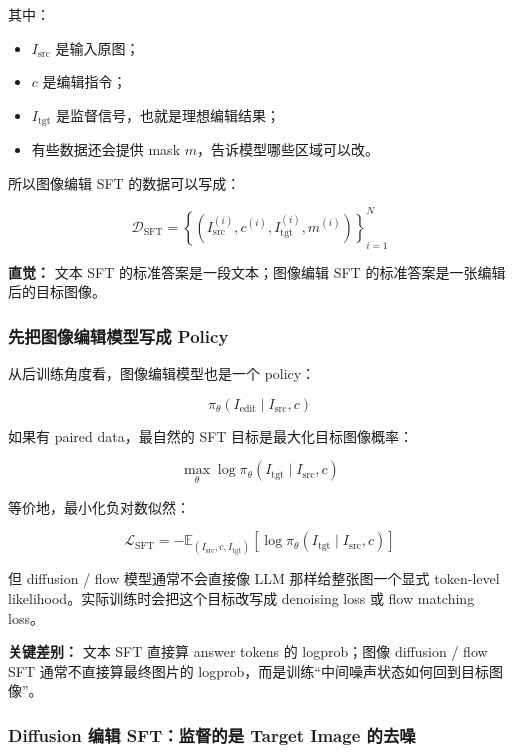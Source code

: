 其中：

\begin{itemize}[leftmargin=1.5em]
  \item $I_\text{src}$ 是输入原图；
  \item $c$ 是编辑指令；
  \item $I_\text{tgt}$ 是监督信号，也就是理想编辑结果；
  \item 有些数据还会提供 mask $m$，告诉模型哪些区域可以改。
\end{itemize}

所以图像编辑 SFT 的数据可以写成：

\[
\mathcal{D}_\text{SFT}
=
\left\{
\left(
I_\text{src}^{(i)},
c^{(i)},
I_\text{tgt}^{(i)},
m^{(i)}
\right)
\right\}_{i=1}^{N}
\]

\begin{intubox}
\textbf{直觉：} 文本 SFT 的标准答案是一段文本；图像编辑 SFT 的标准答案是一张编辑后的目标图像。
\end{intubox}

\subsubsection{先把图像编辑模型写成 Policy}

从后训练角度看，图像编辑模型也是一个 policy：

\[
\pi_\theta(I_\text{edit}\mid I_\text{src},c)
\]

如果有 paired data，最自然的 SFT 目标是最大化目标图像概率：

\[
\max_\theta
\log
\pi_\theta(I_\text{tgt}\mid I_\text{src},c)
\]

等价地，最小化负对数似然：

\[
\mathcal{L}_\text{SFT}
=
-
\mathbb{E}_{(I_\text{src},c,I_\text{tgt})}
\left[
\log
\pi_\theta(I_\text{tgt}\mid I_\text{src},c)
\right]
\]

但 diffusion / flow 模型通常不会直接像 LLM 那样给整张图一个显式 token-level likelihood。实际训练时会把这个目标改写成 denoising loss 或 flow matching loss。

\begin{warnbox}
\textbf{关键差别：} 文本 SFT 直接算 answer tokens 的 logprob；图像 diffusion / flow SFT 通常不直接算最终图片的 logprob，而是训练“中间噪声状态如何回到目标图像”。
\end{warnbox}

\subsubsection{Diffusion 编辑 SFT：监督的是 Target Image 的去噪}

